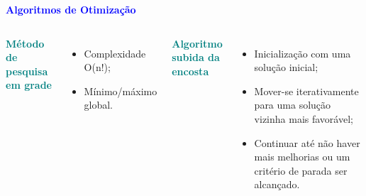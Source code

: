 \documentclass[aspectratio=169]{beamer}
\begin{document}
\begin{frame}{\textcolor{blue}{\textbf{Algoritmos de Otimização}}}

\begin{columns}
\textcolor{teal}{\textbf{Método de pesquisa em grade}}

\begin{itemize}[label={}]
	\item Complexidade O(n!);
	\item Mínimo/máximo global.
\end{itemize}


 

\vspace*{-3.05cm}

\textcolor{teal}{\textbf{Algoritmo subida da encosta}}
\begin{itemize}[label={}]
	\item Inicialização com uma solução inicial;
	\item \justifying Mover-se iterativamente para uma solução vizinha mais favorável;
	\item \justifying Continuar até não haver mais melhorias ou um critério de parada ser alcançado.
\end{itemize}

\end{columns}

\end{frame}
\end{document}
